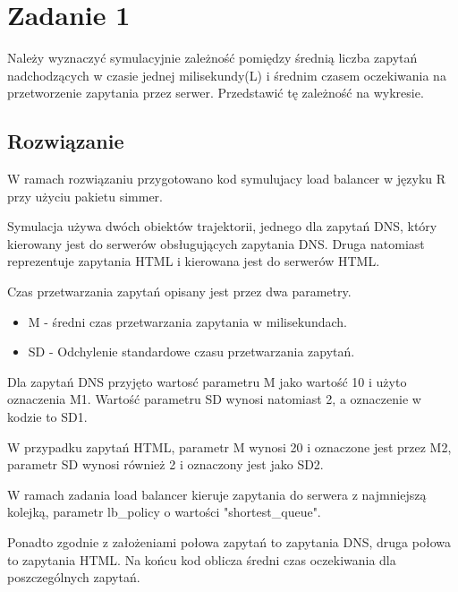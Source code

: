 \documentclass[12pt,oneside,a4paper]{book} %
\theoremstyle{break}
\begin{document}
\chapter*{Zadanie 1}

Należy wyznaczyć symulacyjnie zależność pomiędzy średnią liczba zapytań nadchodzących w czasie jednej milisekundy(L) i średnim czasem oczekiwania na przetworzenie zapytania przez serwer. Przedstawić tę zależność na wykresie.

\section*{Rozwiązanie}

W ramach rozwiązaniu przygotowano kod symulujacy load balancer w języku R przy użyciu pakietu simmer.

Symulacja używa dwóch obiektów trajektorii, jednego dla zapytań DNS, który kierowany jest do serwerów obsługujących zapytania DNS. Druga natomiast reprezentuje zapytania HTML i kierowana jest do serwerów HTML.

Czas przetwarzania zapytań opisany jest przez dwa parametry.
\begin{itemize}
  \item M - średni czas przetwarzania zapytania w milisekundach.
  \item SD - Odchylenie standardowe czasu przetwarzania zapytań.
\end{itemize}

Dla zapytań DNS przyjęto wartosć parametru M jako wartość 10 i użyto oznaczenia M1. Wartość parametru SD wynosi natomiast 2, a oznaczenie w kodzie to SD1.

W przypadku zapytań HTML, parametr M wynosi 20 i oznaczone jest przez M2, parametr SD wynosi również 2 i oznaczony jest jako SD2.

W ramach zadania load balancer kieruje zapytania do serwera z najmniejszą kolejką, parametr lb\_policy o wartości "shortest\_queue".

Ponadto zgodnie z założeniami połowa zapytań to zapytania DNS, druga połowa to zapytania HTML. Na końcu kod oblicza średni czas oczekiwania dla poszczególnych zapytań.

\newpage
\end{document}
